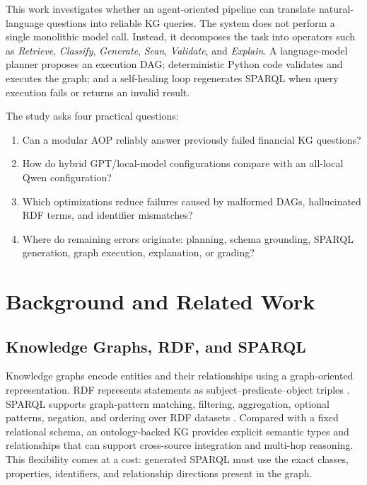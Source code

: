 \documentclass[11pt]{article}
\begin{document}
This work investigates whether an agent-oriented pipeline can translate natural-language questions into reliable KG queries. The system does not perform a single monolithic model call. Instead, it decomposes the task into operators such as \textit{Retrieve}, \textit{Classify}, \textit{Generate}, \textit{Scan}, \textit{Validate}, and \textit{Explain}. A language-model planner proposes an execution DAG; deterministic Python code validates and executes the graph; and a self-healing loop regenerates SPARQL when query execution fails or returns an invalid result.

The study asks four practical questions:

\begin{enumerate}[leftmargin=*]
    \item Can a modular AOP reliably answer previously failed financial KG questions?
    \item How do hybrid GPT/local-model configurations compare with an all-local Qwen configuration?
    \item Which optimizations reduce failures caused by malformed DAGs, hallucinated RDF terms, and identifier mismatches?
    \item Where do remaining errors originate: planning, schema grounding, SPARQL generation, graph execution, explanation, or grading?
\end{enumerate}

\section{Background and Related Work}

\subsection{Knowledge Graphs, RDF, and SPARQL}

Knowledge graphs encode entities and their relationships using a graph-oriented representation. RDF represents statements as subject--predicate--object triples \cite{rdf11}. SPARQL supports graph-pattern matching, filtering, aggregation, optional patterns, negation, and ordering over RDF datasets \cite{sparql11}. Compared with a fixed relational schema, an ontology-backed KG provides explicit semantic types and relationships that can support cross-source integration and multi-hop reasoning. This flexibility comes at a cost: generated SPARQL must use the exact classes, properties, identifiers, and relationship directions present in the graph.
\end{document}
